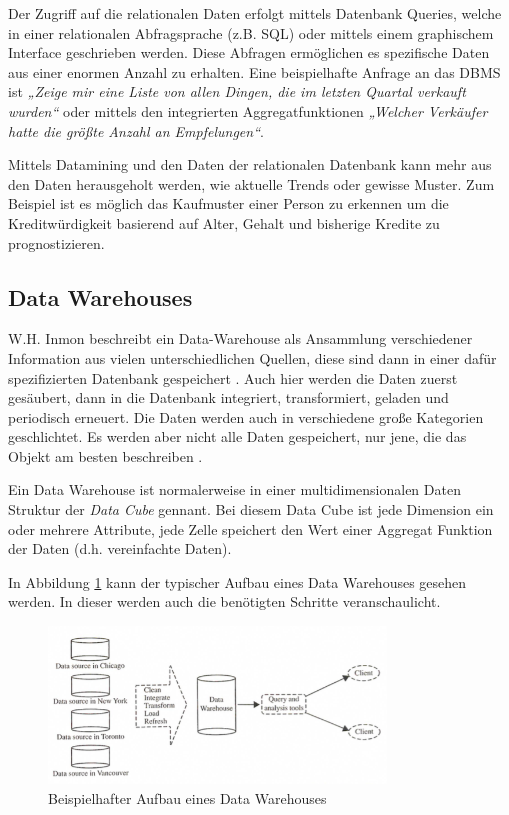 Der Zugriff auf die relationalen Daten erfolgt mittels Datenbank Queries, welche in einer relationalen Abfragsprache (z.B. SQL) oder mittels einem graphischem Interface geschrieben werden. Diese Abfragen ermöglichen es spezifische Daten aus einer enormen Anzahl zu erhalten. Eine beispielhafte Anfrage an das DBMS ist \textit{„Zeige mir eine Liste von allen Dingen, die im letzten Quartal verkauft wurden“} oder mittels den integrierten Aggregatfunktionen \textit{„Welcher Verkäufer hatte die größte Anzahl an Empfelungen“}.

Mittels Datamining und den Daten der relationalen Datenbank kann mehr aus den Daten herausgeholt werden, wie aktuelle Trends oder gewisse Muster. Zum Beispiel ist es möglich das Kaufmuster einer Person zu erkennen um die Kreditwürdigkeit basierend auf Alter, Gehalt und bisherige Kredite zu prognostizieren.

\subsection{Data Warehouses}
W.H. Inmon beschreibt ein Data-Warehouse als Ansammlung verschiedener Information aus vielen unterschiedlichen Quellen, diese sind dann in einer dafür spezifizierten Datenbank gespeichert \cite{DataWarehouseAAG}. Auch hier werden die Daten zuerst gesäubert, dann in die Datenbank integriert, transformiert, geladen und periodisch erneuert. Die Daten werden auch in verschiedene große Kategorien geschlichtet. Es werden aber nicht alle Daten gespeichert, nur jene, die das Objekt am besten beschreiben \cite{DataMiningConceptsAndTechniques}. 

Ein Data Warehouse ist normalerweise in einer multidimensionalen Daten Struktur der \textit{Data Cube} gennant. Bei diesem Data Cube ist jede Dimension ein oder mehrere Attribute, jede Zelle speichert den Wert einer Aggregat Funktion der Daten (d.h. vereinfachte Daten). 

In Abbildung \ref{fig:dbwarehouse} kann der typischer Aufbau eines Data Warehouses gesehen werden. In dieser werden auch die benötigten Schritte veranschaulicht.

\begin{figure}[!h]\centering
	\includegraphics[width=0.8\textwidth]{images/dbwarehouse}
	\caption{Beispielhafter Aufbau eines Data Warehouses\cite{DataMiningConceptsAndTechniques}}
	\label{fig:dbwarehouse}
\end{figure}


